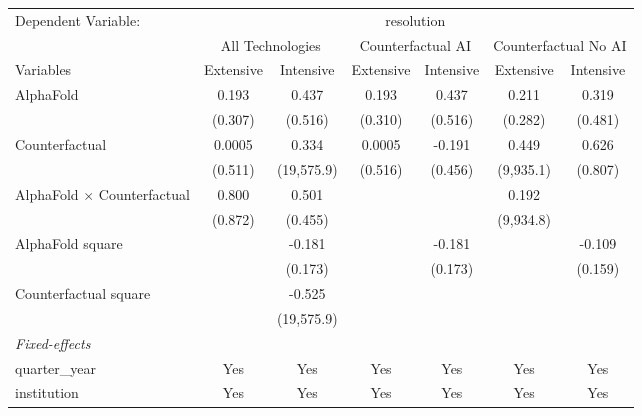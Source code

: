 \begingroup
\centering
\begin{tabular}{lcccccc}
   \tabularnewline \midrule \midrule
   Dependent Variable: & \multicolumn{6}{c}{resolution}\\
 & \multicolumn{2}{c}{All Technologies} & \multicolumn{2}{c}{Counterfactual AI} & \multicolumn{2}{c}{Counterfactual No AI} \\
\cmidrule(lr){1-1}\cmidrule(lr){2-3} \cmidrule(lr){4-5} \cmidrule(lr){6-7}
Variables & \multicolumn{1}{c}{Extensive} & \multicolumn{1}{c}{Intensive} & \multicolumn{1}{c}{Extensive} & \multicolumn{1}{c}{Intensive} & \multicolumn{1}{c}{Extensive} & \multicolumn{1}{c}{Intensive} \\
\cmidrule(lr){1-1}\cmidrule(lr){2-2} \cmidrule(lr){3-3} \cmidrule(lr){4-4} \cmidrule(lr){5-5} \cmidrule(lr){6-6} \cmidrule(lr){7-7}
   AlphaFold                          & 0.193   & 0.437      & 0.193   & 0.437   & 0.211     & 0.319\\   
                                      & (0.307) & (0.516)    & (0.310) & (0.516) & (0.282)   & (0.481)\\   
   Counterfactual                     & 0.0005  & 0.334      & 0.0005  & -0.191  & 0.449     & 0.626\\   
                                      & (0.511) & (19,575.9) & (0.516) & (0.456) & (9,935.1) & (0.807)\\   
   AlphaFold $\times$ Counterfactual  & 0.800   & 0.501      &         &         & 0.192     &   \\   
                                      & (0.872) & (0.455)    &         &         & (9,934.8) &   \\   
   AlphaFold square                   &         & -0.181     &         & -0.181  &           & -0.109\\   
                                      &         & (0.173)    &         & (0.173) &           & (0.159)\\   
   Counterfactual square              &         & -0.525     &         &         &           &   \\   
                                      &         & (19,575.9) &         &         &           &   \\   
   \midrule
   \emph{Fixed-effects}\\
   quarter\_year                      & Yes     & Yes        & Yes     & Yes     & Yes       & Yes\\  
   institution                        & Yes     & Yes        & Yes     & Yes     & Yes       & Yes\\  

\end{tabular}
